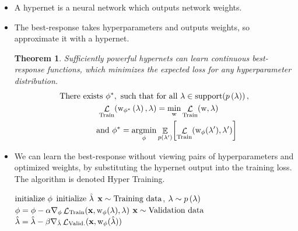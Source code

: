 \documentclass[landscape,a0b,final,a4resizeable]{include/a0poster}
\newtheorem*{theorem*}{Theorem}
\begin{document}
\begin{poster}
\begin{multicols}{3}
\begin{itemize}
	\item A hypernet is a neural network which outputs network weights.
	\item The best-response takes hyperparameters and outputs weights, so approximate it with a hypernet.
	\begin{theorem*}
		Sufficiently powerful hypernets can learn continuous best-response functions, which minimizes the expected loss for any hyperparameter distribution.
		\begin{align*}
			\textnormal{There exists } \responseParam^{*}, \textnormal{ such that }&\hyperDomain, \\
			\innerLoss{\param_{\responseParam^{*}} \left( \hyper \right)}{\hyper} &= \min_{\param} \innerLoss{\param}{\hyper} \\
			\textnormal{and }\responseParam^{*} = \argmin_{\argminTargetFix} &\EhyperFix{\proofLossFix}
		\end{align*}
	\end{theorem*}
\end{itemize}


\newpage 
{}
\newcommand{\curRename}[1]{\smash{\hat{#1}}} %
\newcommand{\variableData}{\bf{x}} %
\newcommand{\prior}[1]{p \left( #1 \right)} %
\newcommand{\hyperDist}{\prior{\hyper}} %
\newcommand{\lossTrainData}[2]{\lossSymbolInner ( \variableData, #1, #2 )} %
\newcommand{\lossValidData}[1]{\lossSymbolOuter ( \variableData, #1)} %

\begin{itemize}
	\item We can learn the best-response without viewing pairs of hyperparameters and optimized weights, by substituting the hypernet output into the training loss.  The algorithm is denoted Hyper Training.
	\\
	\begin{algorithmic}[1]
	\State $\textnormal{initialize } \phi$
	\State $\textrm{initialize } \curRename{\hyper}$
		\State $\variableData \sim \textnormal{Training data}$, $\hyper \sim \hyperDist$
		\State $\responseParam = \responseParam - \alpha \nabla_{\responseParam}\lossTrainData{ \approxResponseSymbol{\responseParam}( \hyper )}{\hyper}$
	\EndFor
		\State $\variableData \sim \textnormal{Validation data}$
		\State $\curRename{\hyper} = \curRename{\hyper} - \beta \nabla_{\curRename{\hyper}} \lossValidData{\approxResponse{\curRename{\hyper}}{\responseParam}}$
	\EndFor \\
	\Return{$\curRename{\hyper}, \approxResponseSymbol{\responseParam} ( \curRename{\hyper} )$}
	\end{algorithmic}
\end{itemize}
\vphantom{A}


\end{multicols}
\end{poster}
\end{document}
